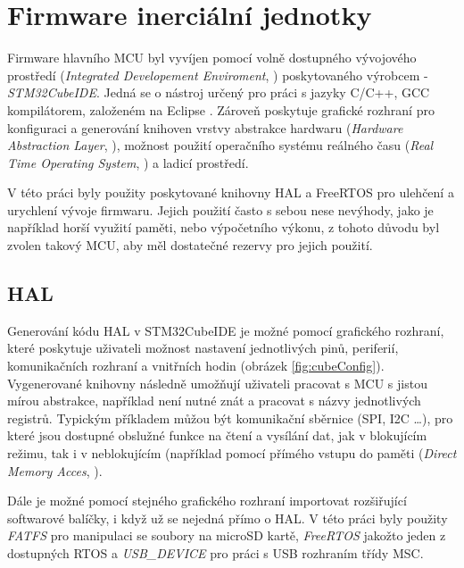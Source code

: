 \chapter{Firmware inerciální jednotky}
Firmware hlavního \ac{MCU} byl vyvíjen pomocí volně dostupného vývojového prostředí (\emph{Integrated Developement
Enviroment}, ) poskytovaného výrobcem - \emph{STM32CubeIDE}. Jedná se o nástroj určený pro práci s jazyky C/C++, GCC kompilátorem, založeném na Eclipse \cite{V2Tf5wsrbWcbQdoW}. Zároveň poskytuje grafické rozhraní pro konfiguraci a generování knihoven vrstvy abstrakce hardwaru (\emph{Hardware Abstraction Layer}, ), možnost použití operačního systému reálného času (\emph{Real Time Operating System}, ) a ladicí prostředí.

V této práci byly použity poskytované knihovny HAL a FreeRTOS pro ulehčení a urychlení vývoje firmwaru. Jejich použití často s sebou nese nevýhody, jako je například horší využití paměti, nebo výpočetního výkonu, z tohoto důvodu byl zvolen takový \ac{MCU}, aby měl dostatečné rezervy pro jejich použití.
\section{HAL}
Generování kódu \ac{HAL} v  STM32CubeIDE je možné pomocí grafického rozhraní, které poskytuje uživateli možnost nastavení jednotlivých pinů, periferií, komunikačních rozhraní a vnitřních hodin (obrázek \ref{fig:cubeConfig}). Vygenerované knihovny následně umožňují uživateli pracovat s \ac{MCU} s jistou mírou abstrakce, například není nutné znát a pracovat s názvy jednotlivých registrů. Typickým příkladem můžou být komunikační sběrnice (\ac{SPI}, \ac{I2C} \ldots), pro které jsou dostupné obslužné funkce na čtení a vysílání dat, jak v blokujícím režimu, tak i v neblokujícím (například pomocí přímého vstupu do paměti (\emph{Direct Memory Acces}, ). \cite{V2Tf5wsrbWcbQdoW}

Dále je možné pomocí stejného grafického rozhraní importovat rozšiřující softwarové balíčky, i když už se nejedná přímo o \ac{HAL}. V této práci byly použity \emph{FATFS} pro manipulaci se soubory na microSD kartě, \emph{FreeRTOS} jakožto jeden z dostupných \ac{RTOS} a \emph{USB\_DEVICE} pro práci s \ac{USB} rozhraním třídy \ac{MSC}.

